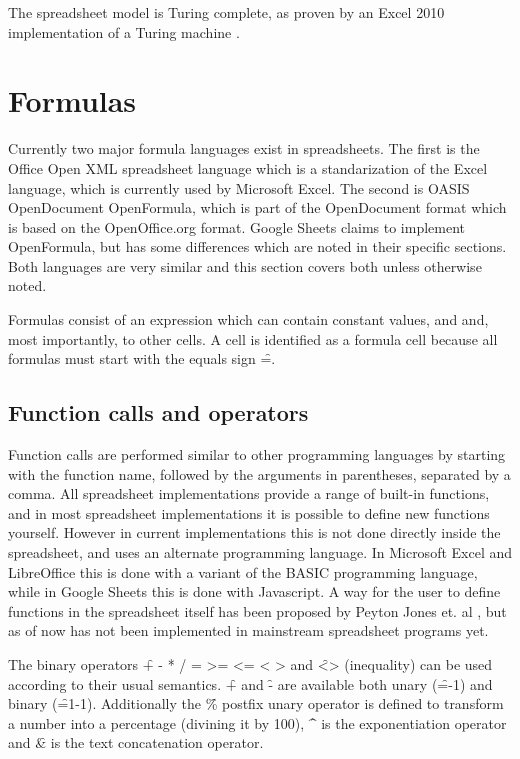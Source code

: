 The spreadsheet model is Turing complete, as proven by an Excel 2010 implementation of a Turing machine \cite{ExcelTuringComplete}.

\section{Formulas}

Currently two major formula languages exist in spreadsheets. The first is the Office Open XML spreadsheet language which is a standarization of the Excel language, which is currently used by Microsoft Excel.
The second is OASIS OpenDocument OpenFormula, which is part of the OpenDocument format which is based on the OpenOffice.org format.
Google Sheets claims to implement OpenFormula, but has some differences which are noted in their specific sections.
Both languages are very similar and this section covers both unless otherwise noted.

Formulas consist of an expression which can contain constant values,  and  and, most importantly,  to other cells.
A cell is identified as a formula cell because all formulas must start with the equals sign \f{=}.

\subsection{Function calls and operators}

Function calls are performed similar to other programming languages by starting with the function name, followed by the arguments in parentheses, separated by a comma.
All spreadsheet implementations provide a range of built-in functions, and in most spreadsheet implementations it is possible to define new functions yourself.
However in current implementations this is not done directly inside the spreadsheet, and uses an alternate programming language.
In Microsoft Excel and LibreOffice this is done with a variant of the BASIC programming language, while in Google Sheets this is done with Javascript.
A way for the user to define functions in the spreadsheet itself has been proposed by Peyton Jones et. al \cite{jones2003user}, but as of now has not been implemented in mainstream spreadsheet programs yet.

The binary operators \f{+ - * / = >= <= < >} and \f{<>} (inequality) can be used according to their usual semantics.
\f{+} and \f{-} are available both unary (\f{=-1}) and binary (\f{=1-1}).
Additionally the \f{\%} postfix unary operator is defined to transform a number into a percentage (divining it by 100), \f{\textasciicircum} is the exponentiation operator and \f{\&} is the text concatenation operator.

